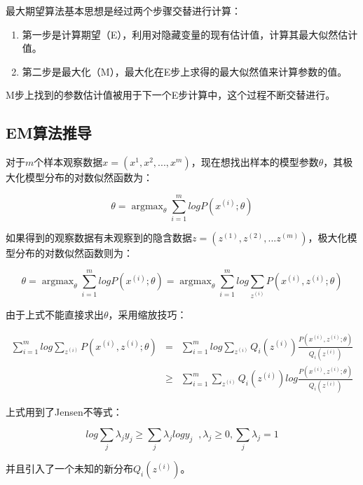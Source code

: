 最大期望算法基本思想是经过两个步骤交替进行计算：

\begin{enumerate}\itemsep0em 
		\item 第一步是计算期望（E），利用对隐藏变量的现有估计值，计算其最大似然估计值。
		\item 第二步是最大化（M），最大化在E步上求得的最大似然值来计算参数的值。
\end{enumerate}

M步上找到的参数估计值被用于下一个E步计算中，这个过程不断交替进行。


\subsection{EM算法推导}

对于$m$个样本观察数据$x=(x^{1},x^{2},...,x^{m})$，现在想找出样本的模型参数$\theta$，其极大化模型分布的对数似然函数为：

$$
\theta = \mathop{\arg\max}_\theta\sum\limits_{i=1}^m logP(x^{(i)};\theta)
$$

如果得到的观察数据有未观察到的隐含数据$z=(z^{(1)},z^{(2)},...z^{(m)})$，极大化模型分布的对数似然函数则为：

\begin{equation} \label{eq:2.2}
\theta =\mathop{\arg\max}_\theta\sum\limits_{i=1}^m logP(x^{(i)};\theta) = \mathop{\arg\max}_\theta\sum\limits_{i=1}^m log\sum\limits_{z^{(i)}}P(x^{(i)}, z^{(i)};\theta)
\end{equation}

由于上式不能直接求出$\theta$，采用缩放技巧：

\begin{equation}\label{eq:2.3}
	\begin{aligned} 
		\sum\limits_{i=1}^m log\sum\limits_{z^{(i)}}P(x^{(i)}, z^{(i)};\theta)&=& \sum\limits_{i=1}^m log\sum\limits_{z^{(i)}}Q_i(z^{(i)})\frac{P(x^{(i)}, z^{(i)};\theta)}{Q_i(z^{(i)})} \\
		&\ge& \sum\limits_{i=1}^m \sum\limits_{z^{(i)}}Q_i(z^{(i)})log\frac{P(x^{(i)}, z^{(i)};\theta)}{Q_i(z^{(i)})}
	\end{aligned}
\end{equation}

上式用到了Jensen不等式：

$$
log\sum\limits_j\lambda_jy_j \geqslant \sum\limits_j\lambda_jlogy_j\;\;,  \lambda_j \geqslant 0, \sum\limits_j\lambda_j =1
$$

并且引入了一个未知的新分布$Q_i(z^{(i)})$。

